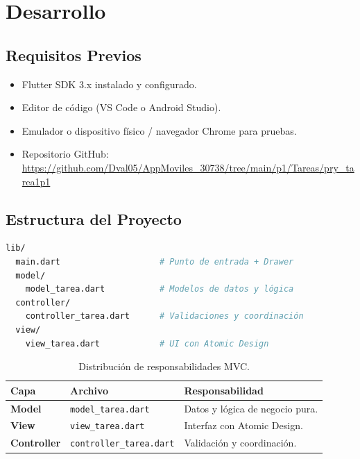 \documentclass{article}
\begin{document}
\newpage

\section{Desarrollo}

\subsection{Requisitos Previos}
\begin{itemize}
    \item Flutter SDK 3.x instalado y configurado.
    \item Editor de código (VS Code o Android Studio).
    \item Emulador o dispositivo físico / navegador Chrome para pruebas.
    \item Repositorio GitHub: \url{https://github.com/Dval05/AppMoviles_30738/tree/main/p1/Tareas/pry_tarea1p1}
\end{itemize}

\subsection{Estructura del Proyecto}
\begin{tcolorbox}[title=Estructura MVC del Proyecto]
\begin{lstlisting}[language=bash]
lib/
  main.dart                    # Punto de entrada + Drawer
  model/
    model_tarea.dart           # Modelos de datos y lógica
  controller/
    controller_tarea.dart      # Validaciones y coordinación
  view/
    view_tarea.dart            # UI con Atomic Design
\end{lstlisting}
\end{tcolorbox}

\begin{table}[H]
\centering
\begin{tabularx}{\textwidth}{l|l|X}
\rowcolor{codeframe} \textbf{Capa} & \textbf{Archivo} & \textbf{Responsabilidad} \\ \hline
\textbf{Model} & \texttt{model\_tarea.dart} & Datos y lógica de negocio pura. \\ \hline
\textbf{View} & \texttt{view\_tarea.dart} & Interfaz con Atomic Design. \\ \hline
\textbf{Controller} & \texttt{controller\_tarea.dart} & Validación y coordinación. \\
\end{tabularx}
\caption{Distribución de responsabilidades MVC.}
\end{table}
\end{document}
